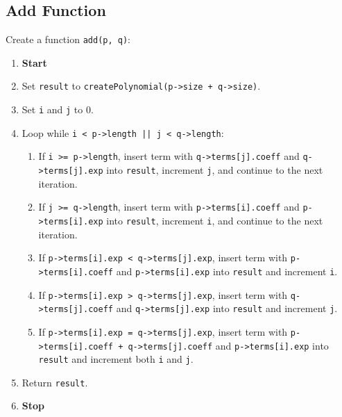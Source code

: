 {  \subsection{Add Function}
  Create a function \texttt{add(p, q)}:
  \begin{enumerate}[label=\arabic*:,left=0pt]
    \item \textbf{Start}
    \item Set \texttt{result} to \texttt{createPolynomial(p->size + q->size)}.
    \item Set \texttt{i} and \texttt{j} to 0.
    \item Loop while \texttt{i < p->length || j < q->length}:
          \begin{enumerate}[label=2.\arabic*:, start=1]
            \item If \texttt{i >= p->length}, insert term with \texttt{q->terms[j].coeff} and \texttt{q->terms[j].exp} into \texttt{result}, \newline increment \texttt{j}, and continue to the next iteration.
            \item If \texttt{j >= q->length}, insert term with \texttt{p->terms[i].coeff} and \texttt{p->terms[i].exp} into \texttt{result}, \newline increment \texttt{i}, and continue to the next iteration.
            \item If \texttt{p->terms[i].exp < q->terms[j].exp}, insert term with \texttt{p->terms[i].coeff} and \newline \texttt{p->terms[i].exp} into \texttt{result} and increment \texttt{i}.
            \item If \texttt{p->terms[i].exp > q->terms[j].exp}, insert term with \texttt{q->terms[j].coeff} and \newline \texttt{q->terms[j].exp} into \texttt{result} and increment \texttt{j}.
            \item If \texttt{p->terms[i].exp = q->terms[j].exp}, insert term with \texttt{p->terms[i].coeff + \newline q->terms[j].coeff} and \texttt{p->terms[i].exp} into \texttt{result} and increment both \texttt{i} and \texttt{j}.
          \end{enumerate}
    \item Return \texttt{result}.
    \item \textbf{Stop}
  \end{enumerate}

}

